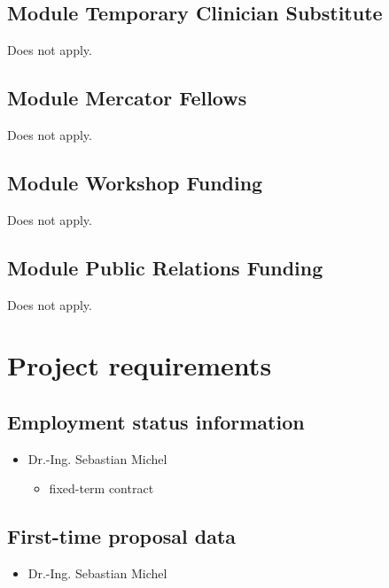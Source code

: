\subsection{Module Temporary Clinician Substitute}
Does not apply.
\subsection{Module Mercator Fellows}
Does not apply.
\subsection{Module Workshop Funding}
Does not apply.
\subsection{Module Public Relations Funding}
Does not apply.

\section{Project requirements}

\subsection{Employment status information}

	\begin{itemize}
	\item Dr.-Ing. Sebastian Michel
		\begin{itemize}
		\item fixed-term contract
		\end{itemize}
	\end{itemize}

\subsection{First-time proposal data}
\begin{itemize}
	\item  Dr.-Ing. Sebastian Michel%
\end{itemize}

